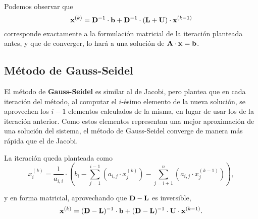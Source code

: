 Podemos observar que
\[ \mathbf{x}^{(k)} = \mathbf{D}^{-1} \cdot \mathbf{b}
    + \mathbf{D}^{-1} \cdot (\mathbf{L} + \mathbf{U}) \cdot \mathbf{x}^{(k-1)}\]
corresponde exactamente a la formulación matricial de la iteración planteada
antes, y que de converger, lo hará a una solución de $\mathbf{A} \cdot \mathbf{x}
= \mathbf{b}$.


\subsection{Método de Gauss-Seidel}
El método de \textbf{Gauss-Seidel} es similar al de Jacobi, pero plantea
que en cada iteración del método, al computar el $i$-ésimo elemento de
la nueva solución, se aprovechen los $i-1$ elementos calculados de la misma,
en lugar de usar los de la iteración anterior. Como estos elementos
representan una mejor aproximación de una solución del sistema, el método
de Gauss-Seidel converge de manera más rápida que el de Jacobi.

La iteración queda planteada como
\[ x^{(k)}_i = \frac{1}{a_{i,i}} \cdot \left( b_i
    - \sum_{j=1}^{i-1}
        \left( a_{i,j} \cdot x^{(k)}_j \right)
    - \sum_{j=i+1}^{n}
        \left( a_{i,j} \cdot x^{(k-1)}_j \right) \right), \]

y en forma matricial, aprovechando que $\mathbf{D} - \mathbf{L}$ es inversible,
\[ \mathbf{x}^{(k)} = (\mathbf{D} - \mathbf{L})^{-1} \cdot \mathbf{b}
    + (\mathbf{D} - \mathbf{L})^{-1} \cdot \mathbf{U} \cdot \mathbf{x}^{(k-1)}. \]

